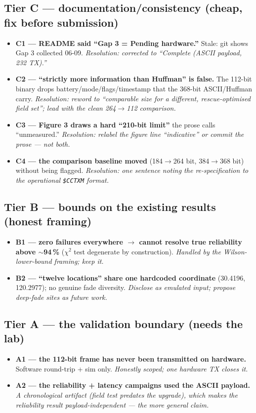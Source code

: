 \documentclass[11pt,a4paper]{article}
\begin{document}
\subsection*{Tier C --- documentation/consistency (cheap, fix before submission)}
\begin{itemize}[leftmargin=1.4em,itemsep=2pt]
  \item \textbf{C1 --- README said ``Gap 3 = Pending hardware.''} Stale: git shows Gap 3
        collected 06-09. \emph{Resolution: corrected to ``Complete (ASCII payload, 232 TX).''}
  \item \textbf{C2 --- ``strictly more information than Huffman'' is false.} The 112-bit
        binary drops battery/mode/flags/timestamp that the 368-bit ASCII/Huffman carry.
        \emph{Resolution: reword to ``comparable size for a different, rescue-optimised field
        set''; lead with the clean 264$\to$112 comparison.}
  \item \textbf{C3 --- Figure 3 draws a hard ``210-bit limit''} the prose calls
        ``unmeasured.'' \emph{Resolution: relabel the figure line ``indicative'' or commit
        the prose --- not both.}
  \item \textbf{C4 --- the comparison baseline moved} (184$\to$264 bit, 384$\to$368 bit)
        without being flagged. \emph{Resolution: one sentence noting the re-specification to
        the operational \texttt{\$CCTXM} format.}
\end{itemize}

\subsection*{Tier B --- bounds on the existing results (honest framing)}
\begin{itemize}[leftmargin=1.4em,itemsep=2pt]
  \item \textbf{B1 --- zero failures everywhere $\to$ cannot resolve true reliability above
        $\sim$94\,\%} ($\chi^2$ test degenerate by construction). \emph{Handled by the
        Wilson-lower-bound framing; keep it.}
  \item \textbf{B2 --- ``twelve locations'' share one hardcoded coordinate}
        (30.4196, 120.2977); no genuine fade diversity. \emph{Disclose as emulated input;
        propose deep-fade sites as future work.}
\end{itemize}

\subsection*{Tier A --- the validation boundary (needs the lab)}
\begin{itemize}[leftmargin=1.4em,itemsep=2pt]
  \item \textbf{A1 --- the 112-bit frame has never been transmitted on hardware.} Software
        round-trip + sim only. \emph{Honestly scoped; one hardware TX closes it.}
  \item \textbf{A2 --- the reliability + latency campaigns used the ASCII payload.}
        \emph{A chronological artifact (field test predates the upgrade), which makes the
        reliability result payload-independent --- the more general claim.}
\end{itemize}
\end{document}
